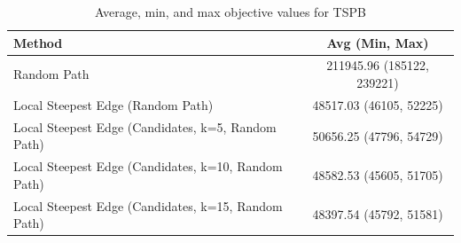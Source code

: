 \begin{table}[h!]
\centering
\begin{tabular}{lc}
\hline
Method & Avg (Min, Max) \\
\hline
Random Path & 211945.96 (185122, 239221) \\
Local Steepest Edge (Random Path) & 48517.03 (46105, 52225) \\
Local Steepest Edge (Candidates, k=5, Random Path) & 50656.25 (47796, 54729) \\
Local Steepest Edge (Candidates, k=10, Random Path) & 48582.53 (45605, 51705) \\
Local Steepest Edge (Candidates, k=15, Random Path) & 48397.54 (45792, 51581) \\
\hline
\end{tabular}
\caption{Average, min, and max objective values for TSPB}
\label{tab:TSPB_scores}
\end{table}
